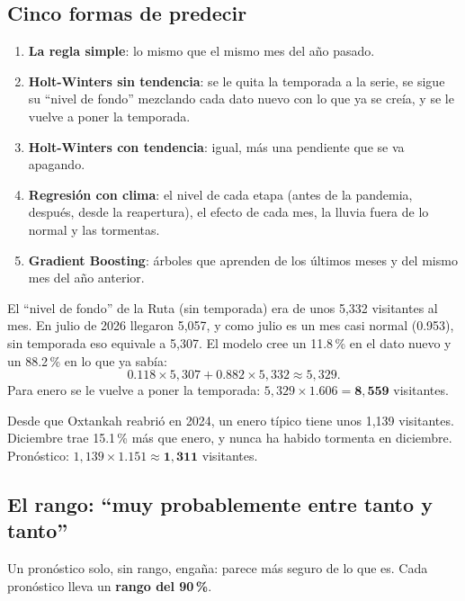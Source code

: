 \subsection{Cinco formas de predecir}
\begin{enumerate}
\item \textbf{La regla simple}: lo mismo que el mismo mes del año pasado.
\item \textbf{Holt-Winters sin tendencia}: se le quita la temporada a la serie, se sigue su ``nivel de fondo'' mezclando
  cada dato nuevo con lo que ya se creía, y se le vuelve a poner la temporada.
\item \textbf{Holt-Winters con tendencia}: igual, más una pendiente que se va apagando.
\item \textbf{Regresión con clima}: el nivel de cada etapa (antes de la pandemia, después, desde la reapertura), el efecto de
  cada mes, la lluvia fuera de lo normal y las tormentas.
\item \textbf{Gradient Boosting}: árboles que aprenden de los últimos meses y del mismo mes del año anterior.
\end{enumerate}

\begin{ejemplo}
El ``nivel de fondo'' de la Ruta (sin temporada) era de unos 5,332 visitantes al mes. En julio de 2026 llegaron 5,057, y
como julio es un mes casi normal (0.953), sin temporada eso equivale a 5,307. El modelo cree un 11.8\,\% en el dato nuevo y
un 88.2\,\% en lo que ya sabía:
\[
0.118\times5{,}307+0.882\times5{,}332\approx5{,}329 .
\]
Para enero se le vuelve a poner la temporada: $5{,}329\times1.606=\mathbf{8{,}559}$ visitantes.
\end{ejemplo}

\begin{ejemplo}
Desde que Oxtankah reabrió en 2024, un enero típico tiene unos 1,139 visitantes. Diciembre trae 15.1\,\% más que enero, y
nunca ha habido tormenta en diciembre. Pronóstico: $1{,}139\times1.151\approx\mathbf{1{,}311}$ visitantes.
\end{ejemplo}

\subsection{El rango: ``muy probablemente entre tanto y tanto''}
Un pronóstico solo, sin rango, engaña: parece más seguro de lo que es. Cada pronóstico lleva un \textbf{rango del 90\,\%}.

